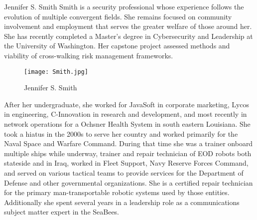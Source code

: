 \begin{IEEEbiography}{Jennifer S. Smith}
 Smith is a security professional whose experience follows the evolution of multiple convergent fields. She remains focused on community involvement and employment that serves the greater welfare of those around her. She has recently completed a Master's degree in Cybersecurity and Leadership at the University of Washington. Her capstone project assessed methods and viability of cross-walking risk management frameworks.
\begin{figure}
  \centerline{\texttt{[image: Smith.jpg]}}
  \caption{Jennifer S. Smith}
  \label{fig:JS}
\end{figure}
After her undergraduate, she worked for JavaSoft in corporate marketing, Lycos in engineering, C-Innovation in research and development, and most recently in network operations for a Ochsner Health System in south eastern Louisiana. She took a hiatus in the 2000s to serve her country and worked primarily for the Naval Space and Warfare Command. During that time she was a trainer onboard multiple ships while underway, trainer and repair technician of EOD robots both stateside and in Iraq, worked in Fleet Support, Navy Reserve Forces Command, and served on various tactical teams to provide services for the Department of Defense and other governmental organizations. She is a certified repair technician for the primary man-transportable robotic systems used by those entities. Additionally she spent several years in a leadership role as a communications subject matter expert in the SeaBees.
\end{IEEEbiography}
